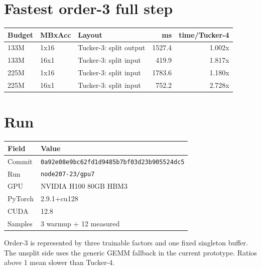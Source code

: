 \documentclass[10pt]{article}
\begin{document}
\section{Fastest order-3 full step}
\begin{center}
\small
\begin{tabular}{lllrr}
\toprule
\textbf{Budget} & \textbf{MBxAcc} & \textbf{Layout} & \textbf{ms} & \textbf{time/Tucker-4} \\
\midrule
133M & 1x16 & Tucker-3: split output & 1527.4 & 1.002x \\
133M & 16x1 & Tucker-3: split input & 419.9 & 1.817x \\
225M & 1x16 & Tucker-3: split input & 1783.6 & 1.180x \\
225M & 16x1 & Tucker-3: split input & 752.2 & 2.728x \\
\bottomrule
\end{tabular}
\end{center}
\section{Run}
\begin{center}
\small
\begin{tabular}{ll}
\toprule
\textbf{Field} & \textbf{Value} \\
\midrule
Commit & \texttt{0a92e08e9bc62fd1d9485b7bf03d23b905524dc5} \\
Run & \texttt{node207-23/gpu7} \\
GPU & NVIDIA H100 80GB HBM3 \\
PyTorch & 2.9.1+cu128 \\
CUDA & 12.8 \\
Samples & 3 warmup + 12 measured \\
\bottomrule
\end{tabular}
\end{center}
\footnotesize Order-3 is represented by three trainable factors and one fixed singleton buffer. The unsplit side uses the generic GEMM fallback in the current prototype. Ratios above 1 mean slower than Tucker-4.
\end{document}

